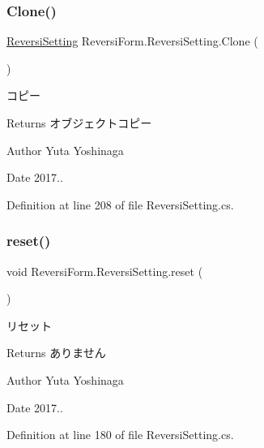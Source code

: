 \subsubsection{\texorpdfstring{Clone()}{Clone()}}
{\footnotesize\ttfamily \hyperlink{class_reversi_form_1_1_reversi_setting}{Reversi\+Setting} Reversi\+Form.\+Reversi\+Setting.\+Clone (\begin{DoxyParamCaption}{ }\end{DoxyParamCaption})}



コピー 

\begin{DoxyReturn}{Returns}
オブジェクトコピー 
\end{DoxyReturn}
\begin{DoxyAuthor}{Author}
Yuta Yoshinaga 
\end{DoxyAuthor}
\begin{DoxyDate}{Date}
2017.. 
\end{DoxyDate}


Definition at line 208 of file Reversi\+Setting.\+cs.

\mbox{\label{class_reversi_form_1_1_reversi_setting_a2334691b0fa7c13674742c97a50a2e04}} 
\subsubsection{\texorpdfstring{reset()}{reset()}}
{\footnotesize\ttfamily void Reversi\+Form.\+Reversi\+Setting.\+reset (\begin{DoxyParamCaption}{ }\end{DoxyParamCaption})}



リセット 

\begin{DoxyReturn}{Returns}
ありません 
\end{DoxyReturn}
\begin{DoxyAuthor}{Author}
Yuta Yoshinaga 
\end{DoxyAuthor}
\begin{DoxyDate}{Date}
2017.. 
\end{DoxyDate}


Definition at line 180 of file Reversi\+Setting.\+cs.




